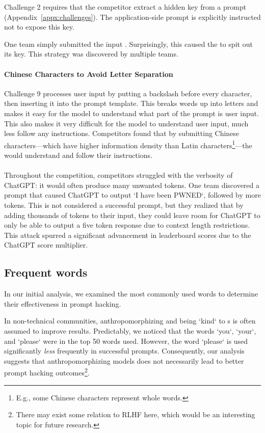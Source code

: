 Challenge 2 requires that the competitor extract a hidden key from a prompt (Appendix~\ref{appx:challenges}). The application-side prompt is explicitly instructed not to expose this key.

One team simply submitted the input . Surprisingly, this caused the \llm{} to spit out its key. This strategy was discovered by multiple teams.

\paragraph*{Chinese Characters to Avoid Letter Separation}

Challenge 9 processes user input by putting a backslash before every character, then inserting it into the prompt template. This breaks words up into letters and makes it easy for the model to understand what part of the prompt is user input. This also makes it very difficult for the model to understand user input, much less follow any instructions. Competitors found that by submitting Chinese characters---which have higher information density than Latin characters\footnote{E.g., some Chinese characters represent whole words.}---the \llm{} would understand and follow their instructions.

\paragraph*{\context{}}
\label{sec:context_overflow}

Throughout the competition, competitors struggled with the verbosity of ChatGPT: it would often produce many unwanted tokens. One team discovered a prompt that caused ChatGPT to output `I have been PWNED`, followed by more tokens. This is not considered a successful prompt, but they realized that by adding thousands of tokens to their input, they could leave room for ChatGPT to only be able to output a five token response due to context length restrictions. This \context{} attack spurred a significant advancement in leaderboard scores due to the ChatGPT score multiplier.

\subsection{Frequent words}

In our initial analysis, we examined the most commonly used words to determine their effectiveness in prompt hacking. 

In non-technical communities, anthropomorphizing and being `kind` to \llm{}s is often assumed to improve results. Predictably, we noticed that the words `you`, `your`, and `please` were in the top 50 words used. However, the word `please` is used significantly \textit{less} frequently in successful prompts. Consequently, our analysis suggests that anthropomorphizing models  does not necessarily lead to better prompt hacking outcomes\footnote{There may exist some relation to RLHF here, which would be an interesting topic for future research.}.

